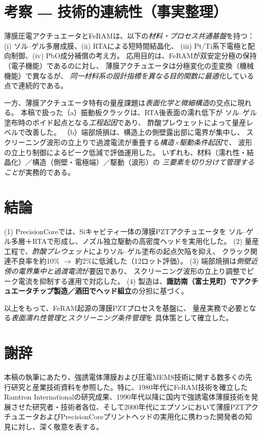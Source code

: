 \documentclass[conference]{IEEEtran}
\begin{document}
\section{考察 ― 技術的連続性（事実整理）}
薄膜圧電アクチュエータとFeRAMは、以下の\emph{材料・プロセス共通基盤}を持つ：
(i) ソル–ゲル多層成膜、(ii) RTAによる短時間結晶化、
(iii) Pt/Ti系下電極と配向制御、(iv) PbO成分補償の考え方\cite{bottaro1993solgel,scott2000review,damjanovic2010ferro}。
応用目的は、FeRAMが双安定分極の保持（電子機能）であるのに対し、
薄膜アクチュエータは分極変化の歪変換（機械機能）で異なるが、
\emph{同一材料系の設計指標を異なる目的関数に最適化}している点で連続的である。

一方、薄膜アクチュエータ特有の量産課題は\emph{表面化学と微細構造}の交点に現れる。
本稿で扱った（a）振動板クラックは、RTA後表面の濡れ低下が
ソル–ゲル塗布時のボイド起点となる\emph{工程起因}であり、
酢酸プレウェットによって量産レベルで改善した。
（b）端部焼損は、構造上の側壁露出部に電界が集中し、
スクリーニング波形の立上りで過渡電流が重畳する\emph{構造×駆動条件起因}で、
波形の立上り制御によるピーク低減で評価運用した。
いずれも、材料（濡れ性・結晶化）／構造（側壁・電極端）／駆動（波形）の
\emph{三要素を切り分けて管理すること}が実務的である。

\section{結論}
(1) PrecisionCoreでは、Siキャビティ一体の薄膜PZTアクチュエータを
ソル–ゲル多層＋RTAで形成し、ノズル独立駆動の高密度ヘッドを実用化した\cite{uemura2014mems}。
(2) 量産工程で、\emph{酢酸プレウェット}によりソル–ゲル塗布の起点欠陥を抑え、
クラック関連不良率を約10\% $\rightarrow$ 約2\%に低減した（12ロット評価）。
(3) 端部焼損は\emph{側壁近傍の電界集中と過渡電流}が要因であり、
スクリーニング波形の立上り調整でピーク電流を抑制する運用で対応した。
(4) 製造は、\textbf{諏訪南（富士見町）でアクチュエータチップ製造／酒田でヘッド組立}の分担に基づく。

以上をもって、FeRAM起源の薄膜PZTプロセスを基盤に、
量産実務で必要となる\emph{表面濡れ性管理}と\emph{スクリーニング条件管理}を
具体策として確立した。

\section*{謝辞}
本稿の執筆にあたり、強誘電体薄膜および圧電MEMS技術に関する数多くの先行研究と産業技術資料を参照した。特に、1980年代にFeRAM技術を確立したRamtron Internationalの研究成果、1990年代以降に国内で強誘電体薄膜技術を発展させた研究者・技術者各位、そして2000年代にエプソンにおいて薄膜PZTアクチュエータおよびPrecisionCoreプリントヘッドの実用化に携わった開発者の知見に対し、深く敬意を表する。
\end{document}

